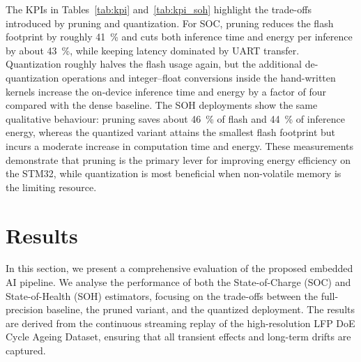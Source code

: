 \documentclass[final,3p,times]{elsarticle}
\begin{document}
The KPIs in Tables~\ref{tab:kpi} and~\ref{tab:kpi_soh} highlight the trade-offs introduced by pruning and quantization.
For SOC, pruning reduces the flash footprint by roughly 41~\% and cuts both inference time and energy per inference
by about 43~\%, while keeping latency dominated by UART transfer. Quantization roughly halves the flash usage again,
but the additional de-quantization operations and integer--float conversions inside the hand-written kernels increase
the on-device inference time and energy by a factor of four compared with the dense baseline. The SOH deployments show
the same qualitative behaviour: pruning saves about 46~\% of flash and 44~\% of inference energy, whereas the
quantized variant attains the smallest flash footprint but incurs a moderate increase in computation time and energy.
These measurements demonstrate that pruning is the primary lever for improving energy efficiency on the STM32, while
quantization is most beneficial when non-volatile memory is the limiting resource.

\section{Results}
\label{sec:results}
In this section, we present a comprehensive evaluation of the proposed embedded AI pipeline. We analyse the performance of both the State-of-Charge (SOC) and State-of-Health (SOH) estimators, focusing on the trade-offs between the full-precision baseline, the pruned variant, and the quantized deployment. The results are derived from the continuous streaming replay of the high-resolution LFP DoE Cycle Ageing Dataset, ensuring that all transient effects and long-term drifts are captured.
\end{document}
